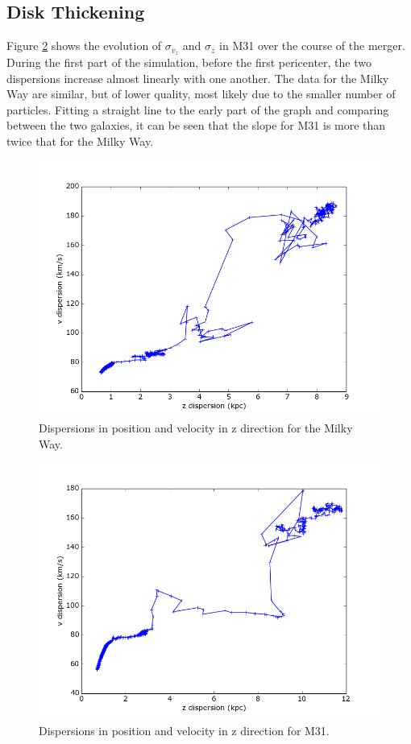\documentclass[iop]{emulateapj}
\begin{document}
\subsection{Disk Thickening}
Figure \ref{fig:m31disp} shows the evolution of $\sigma_{v_z}$ and $\sigma_z$ in M31 over the course of the merger. During the first part of the simulation, before the first pericenter, the two dispersions increase almost linearly with one another. The data for the Milky Way are similar, but of lower quality, most likely due to the smaller number of particles. Fitting a straight line to the early part of the graph and comparing between the two galaxies, it can be seen that the slope for M31 is more than twice that for the Milky Way.

\begin{figure}[c]
\includegraphics[width=12cm]{../MW_000_599_stats/MW_dispersions.png}
\caption{Dispersions in position and velocity in z direction for the Milky Way.}
\label{fig:mwdisp}
\end{figure}

\begin{figure}[c]
\includegraphics[width=12cm]{../M31_000_599_stats/M31_dispersions.png}
\caption{Dispersions in position and velocity in z direction for M31.}
\label{fig:m31disp}
\end{figure}
\end{document}
